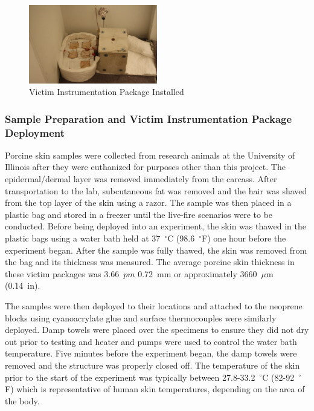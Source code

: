 \documentclass[12pt,oneside]{book}
\begin{document}
\begin{figure}[H]
\centering
\includegraphics[width=0.5\textwidth]{../0_Images/Instrumentation/Burn_Measurements/SBA_Deployed}
\caption{Victim Instrumentation Package Installed}
\label{fig:inst_SBA_deployed}
\end{figure}

\subsubsection{Sample Preparation and Victim Instrumentation Package Deployment}
Porcine skin samples were collected from research animals at the University of Illinois after they were euthanized for purposes other than this project. The epidermal/dermal layer was removed immediately from the carcass.  After transportation to the lab, subcutaneous fat was removed and the hair was shaved from the top layer of the skin using a razor. The sample was then placed in a plastic bag and stored in a freezer until the live-fire scenarios were to be conducted. Before being deployed into an experiment, the skin was thawed in the plastic bags using a water bath held at 37~$^\circ$C (98.6~$^\circ$F) one hour before the experiment began. After the sample was fully thawed, the skin was removed from the bag and its thickness was measured. The average porcine skin thickness in these victim packages was 3.66~$pm$ 0.72~mm or approximately 3660~$\mu$m (0.14~in).  

The samples were then deployed to their locations and attached to the neoprene blocks using cyanoacrylate glue and surface thermocouples were similarly deployed. Damp towels were placed over the specimens to ensure they did not dry out prior to testing and heater and pumps were used to control the water bath temperature. Five minutes before the experiment began, the damp towels were removed and the structure was properly closed off. The temperature of the skin prior to the start of the experiment was typically between 27.8-33.2~$^\circ$C (82-92~$^\circ$F) which is representative of human skin temperatures, depending on the area of the body.
\end{document}

